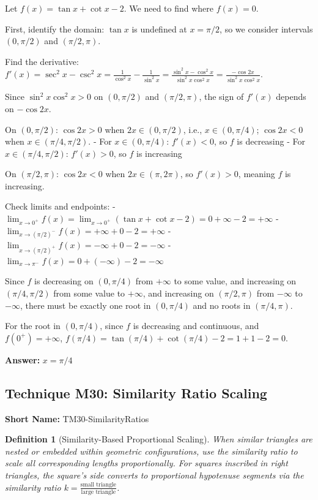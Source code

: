 \documentclass[12pt]{article}
\newtheorem{definition}{Definition}[section]
\newenvironment{solution}
{\begin{tcolorbox}[colback=green!5!white,colframe=green!75!black,title={Solution}]}{\end{tcolorbox}}
\begin{document}
\begin{solution}
Let $f(x) = \tan x + \cot x - 2$. We need to find where $f(x) = 0$.

First, identify the domain: $\tan x$ is undefined at $x = \pi/2$, so we consider intervals $(0, \pi/2)$ and $(\pi/2, \pi)$.

Find the derivative: $f'(x) = \sec^2 x - \csc^2 x = \frac{1}{\cos^2 x} - \frac{1}{\sin^2 x} = \frac{\sin^2 x - \cos^2 x}{\sin^2 x \cos^2 x} = \frac{-\cos 2x}{\sin^2 x \cos^2 x}$.

Since $\sin^2 x \cos^2 x > 0$ on $(0, \pi/2)$ and $(\pi/2, \pi)$, the sign of $f'(x)$ depends on $-\cos 2x$.

On $(0, \pi/2)$: $\cos 2x > 0$ when $2x \in (0, \pi/2)$, i.e., $x \in (0, \pi/4)$; $\cos 2x < 0$ when $x \in (\pi/4, \pi/2)$.
- For $x \in (0, \pi/4)$: $f'(x) < 0$, so $f$ is decreasing
- For $x \in (\pi/4, \pi/2)$: $f'(x) > 0$, so $f$ is increasing

On $(\pi/2, \pi)$: $\cos 2x < 0$ when $2x \in (\pi, 2\pi)$, so $f'(x) > 0$, meaning $f$ is increasing.

Check limits and endpoints:
- $\lim_{x \to 0^+} f(x) = \lim_{x \to 0^+} (\tan x + \cot x - 2) = 0 + \infty - 2 = +\infty$
- $\lim_{x \to (\pi/2)^-} f(x) = +\infty + 0 - 2 = +\infty$
- $\lim_{x \to (\pi/2)^+} f(x) = -\infty + 0 - 2 = -\infty$
- $\lim_{x \to \pi^-} f(x) = 0 + (-\infty) - 2 = -\infty$

Since $f$ is decreasing on $(0, \pi/4)$ from $+\infty$ to some value, and increasing on $(\pi/4, \pi/2)$ from some value to $+\infty$, and increasing on $(\pi/2, \pi)$ from $-\infty$ to $-\infty$, there must be exactly one root in $(0, \pi/4)$ and no roots in $(\pi/4, \pi)$.

For the root in $(0, \pi/4)$, since $f$ is decreasing and continuous, and $f(0^+) = +\infty$, $f(\pi/4) = \tan(\pi/4) + \cot(\pi/4) - 2 = 1 + 1 - 2 = 0$.

\textbf{Answer:} $x = \pi/4$
\end{solution}

\subsection{Technique M30: Similarity Ratio Scaling}
\textbf{Short Name:} TM30-SimilarityRatios

\begin{definition}[Similarity-Based Proportional Scaling]
When similar triangles are nested or embedded within geometric configurations, use the similarity ratio to scale all corresponding lengths proportionally. For squares inscribed in right triangles, the square's side converts to proportional hypotenuse segments via the similarity ratio $k = \frac{\text{small triangle}}{\text{large triangle}}$.
\end{definition}
\end{document}
